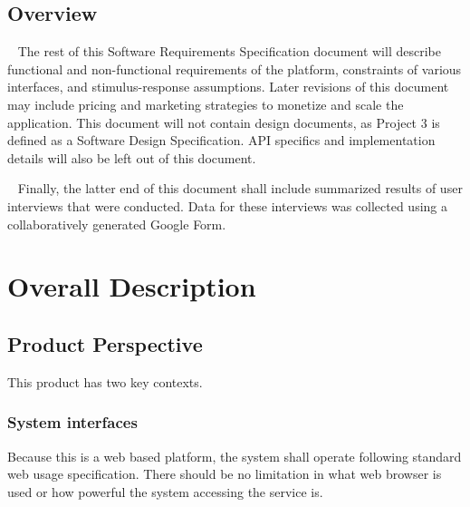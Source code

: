\documentclass{scrreprt}
\begin{document}
\section{Overview}
\par ~ The rest of this Software Requirements Specification document will describe functional and non-functional requirements of the platform, constraints of various interfaces, and stimulus-response assumptions. Later revisions of this document may include pricing and marketing strategies to monetize and scale the application. This document will not contain design documents, as Project 3 is defined as a Software Design Specification. API specifics and implementation details will also be left out of this document. 

\par ~ Finally, the latter end of this document shall include summarized results of user interviews that were conducted. Data for these interviews was collected using a collaboratively generated Google Form.


\chapter{Overall Description}


\section{Product Perspective}
This product has two key contexts.


\subsection{System interfaces}
Because this is a web based platform, the system shall operate following standard web usage specification. There should be no limitation in what web browser is used or how powerful the system accessing the service is.
\end{document}
